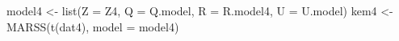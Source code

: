 \begin{Schunk}
\begin{Sinput}
 model4 <- list(Z = Z4, Q = Q.model, R = R.model4, U = U.model)
 kem4 <- MARSS(t(dat4), model = model4)
\end{Sinput}
\end{Schunk}
